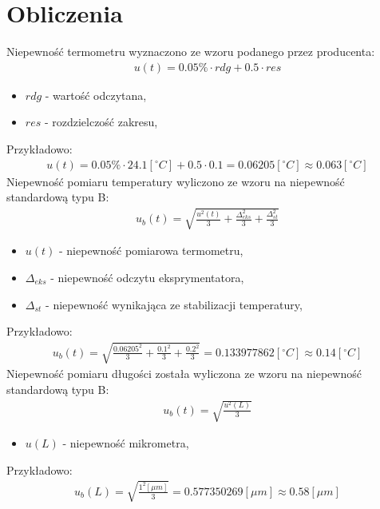 \documentclass[11pt]{article}
\begin{document}
    \section{Obliczenia}
    \noindent Niepewność termometru wyznaczono ze wzoru podanego przez producenta:
    \begin{gather*}
        u(t)=0.05\%\cdot rdg+0.5\cdot res
    \end{gather*}
    {\footnotesize
        \begin{itemize}
            \item[] $rdg$ - wartość odczytana,
            \item[] $res$ - rozdzielczość zakresu,
        \end{itemize}}
    \noindent Przykładowo:
    \begin{gather*}
        u(t)=0.05\%\cdot 24.1[^{\circ}C]+0.5\cdot 0.1=0.06205 [^{\circ}C]\approx 0.063 [^{\circ}C]
    \end{gather*}
    \noindent Niepewność pomiaru temperatury wyliczono ze wzoru na niepewność standardową typu B:
    \begin{gather*}
        u_b(t)=\sqrt{\frac{u^2(t)}{3}+\frac{\Delta_{eks}^2}{3}+\frac{\Delta_{st}^2}{3}}
    \end{gather*}
    {\footnotesize
        \begin{itemize}
            \item[] $u(t)$ - niepewność pomiarowa termometru,
            \item[] $\Delta_{eks}$ - niepewność odczytu eksprymentatora,
            \item[] $\Delta_{st}$ - niepewność wynikająca ze stabilizacji temperatury,
        \end{itemize}}
    \noindent Przykładowo:
    \begin{gather*}
        u_b(t)=\sqrt{\frac{0.06205^2}{3}+\frac{0.1^2}{3}+\frac{0.2^2}{3}}=0.133977862 [^{\circ}C]\approx 0.14 [^{\circ}C]
    \end{gather*}
    \noindent Niepewność pomiaru długości została wyliczona ze wzoru na niepewność standardową typu B:
    \begin{gather*}
        u_b(t)=\sqrt{\frac{u^2(L)}{3}}
    \end{gather*}
    {\footnotesize
        \begin{itemize}
            \item[] $u(L)$ - niepewność mikrometra,
        \end{itemize}}
    \noindent Przykładowo:
    \begin{gather*}
        u_b(L)=\sqrt{\frac{1^2[\mu m]}{3}}=0.577350269 [\mu m]\approx 0.58 [\mu m]
    \end{gather*}
\end{document}
